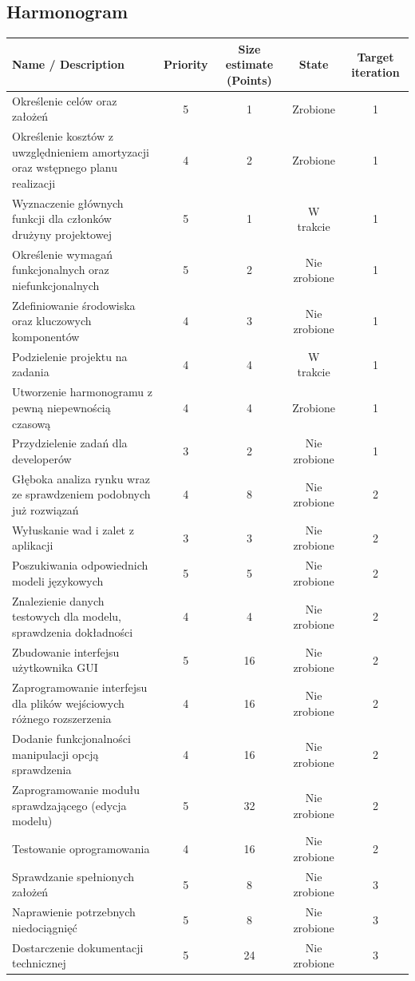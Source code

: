 \documentclass[a4paper, 12pt]{article}
\begin{document}
\subsection{Harmonogram}
\begin{center}
\footnotesize
\begin{tabular}{|p{}|c|c|c|c|}
\hline
\textbf{Name / Description} & \textbf{Priority} & \textbf{Size estimate (Points)} & \textbf{State} & \textbf{Target iteration} \\
\hline
Określenie celów oraz założeń & 5 & 1 & Zrobione & 1 \\
\hline
Określenie kosztów z uwzględnieniem amortyzacji oraz wstępnego planu realizacji & 4 & 2 & Zrobione & 1 \\
\hline
Wyznaczenie głównych funkcji dla członków drużyny projektowej & 5 & 1 & W trakcie & 1 \\
\hline
Określenie wymagań funkcjonalnych oraz niefunkcjonalnych & 5 & 2 & Nie zrobione & 1 \\
\hline
Zdefiniowanie środowiska oraz kluczowych komponentów & 4 & 3 & Nie zrobione & 1 \\
\hline
Podzielenie projektu na zadania & 4 & 4 & W trakcie & 1 \\
\hline
Utworzenie harmonogramu z pewną niepewnością czasową & 4 & 4 & Zrobione & 1 \\
\hline
Przydzielenie zadań dla developerów & 3 & 2 & Nie zrobione & 1 \\
\hline
Głęboka analiza rynku wraz ze sprawdzeniem podobnych już rozwiązań & 4 & 8 & Nie zrobione & 2 \\
\hline
Wyłuskanie wad i zalet z aplikacji & 3 & 3 & Nie zrobione & 2 \\
\hline
Poszukiwania odpowiednich modeli językowych & 5 & 5 & Nie zrobione & 2 \\
\hline
Znalezienie danych testowych dla modelu, sprawdzenia dokładności & 4 & 4 & Nie zrobione & 2 \\
\hline
Zbudowanie interfejsu użytkownika GUI & 5 & 16 & Nie zrobione & 2 \\
\hline
Zaprogramowanie interfejsu dla plików wejściowych różnego rozszerzenia & 4 & 16 & Nie zrobione & 2 \\
\hline
Dodanie funkcjonalności manipulacji opcją sprawdzenia & 4 & 16 & Nie zrobione & 2 \\
\hline
Zaprogramowanie modułu sprawdzającego (edycja modelu) & 5 & 32 & Nie zrobione & 2 \\
\hline
Testowanie oprogramowania & 4 & 16 & Nie zrobione & 2 \\
\hline
Sprawdzanie spełnionych założeń & 5 & 8 & Nie zrobione & 3 \\
\hline
Naprawienie potrzebnych niedociągnięć & 5 & 8 & Nie zrobione & 3 \\
\hline
Dostarczenie dokumentacji technicznej & 5 & 24 & Nie zrobione & 3 \\
\hline
\end{tabular}
\end{center}
\end{document}
